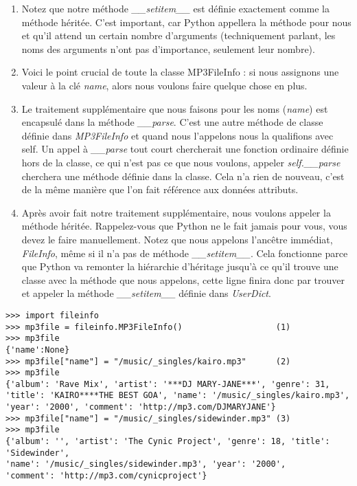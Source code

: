 \begin{enumerate}
    \item Notez que notre méthode \emph{\_\_setitem\_\_} est définie exactement comme la méthode héritée. C'est important, car Python appellera la méthode pour nous et qu'il attend un certain nombre d'arguments (techniquement parlant, les noms des arguments n'ont pas d'importance, seulement leur nombre).
    \item Voici le point crucial de toute la classe MP3FileInfo : si nous assignons une valeur à la clé \emph{name}, alors nous voulons faire quelque chose en plus.
    \item Le traitement supplémentaire que nous faisons pour les noms (\emph{name}) est encapsulé dans la méthode \emph{\_\_parse}. C'est une autre méthode de classe définie dans \emph{MP3FileInfo} et quand nous l'appelons nous la qualifions avec self. Un appel à \emph{\_\_parse} tout court chercherait une fonction ordinaire définie hors de la classe, ce qui n'est pas ce que nous voulons, appeler \emph{self.\_\_parse} cherchera une méthode définie dans la classe. Cela n'a rien de nouveau, c'est de la même manière que l'on fait référence aux données attributs.
    \item Après avoir fait notre traitement supplémentaire, nous voulons appeler la méthode héritée. Rappelez-vous que Python ne le fait jamais pour vous, vous devez le faire manuellement. Notez que nous appelons l'ancêtre immédiat, \emph{FileInfo}, même si il n'a pas de méthode \emph{\_\_setitem\_\_}. Cela fonctionne parce que Python va remonter la hiérarchie d'héritage jusqu'à ce qu'il trouve une classe avec la méthode que nous appelons, cette ligne finira donc par trouver et appeler la méthode \emph{\_\_setitem\_\_} définie dans \emph{UserDict}.
\end{enumerate}

\medskip
{}

\begin{example}
\begin{lstlisting}
>>> import fileinfo
>>> mp3file = fileinfo.MP3FileInfo()                   (1)
>>> mp3file
{'name':None}
>>> mp3file["name"] = "/music/_singles/kairo.mp3"      (2)
>>> mp3file
{'album': 'Rave Mix', 'artist': '***DJ MARY-JANE***', 'genre': 31,
'title': 'KAIRO****THE BEST GOA', 'name': '/music/_singles/kairo.mp3',
'year': '2000', 'comment': 'http://mp3.com/DJMARYJANE'}
>>> mp3file["name"] = "/music/_singles/sidewinder.mp3" (3)
>>> mp3file
{'album': '', 'artist': 'The Cynic Project', 'genre': 18, 'title': 'Sidewinder',
'name': '/music/_singles/sidewinder.mp3', 'year': '2000',
'comment': 'http://mp3.com/cynicproject'}
\end{lstlisting}
\end{example}

